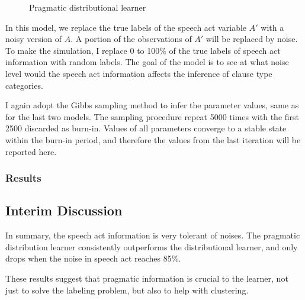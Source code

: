 \begin{figure}[H]
\begin{center}
\end{center}
\caption{Pragmatic distributional learner}\label{fig: noisy-model}
\end{figure}

In this model, we replace the true labels of the speech act variable $A'$ with a noisy version of $A$. A portion of the observations of $A'$ will be replaced by noise. To make the simulation, I replace 0 to 100\% of the true labels of speech act information with random labels. The goal of the model is to see at what noise level would the speech act information affects the inference of clause type categories. 

I again adopt the Gibbs sampling method to infer the parameter values, same as for the last two models. The sampling procedure repeat 5000 times with the first 2500 discarded as burn-in. Values of all parameters converge to a stable state within the burn-in period, and therefore the values from the last iteration will be reported here. 

\subsubsection{Results}
\label{sec:engcl:model:noisy:results}


\subsection{Interim Discussion}
\label{sec:engcl:model:disc}
In summary, the speech act information is very tolerant of noises. The pragmatic distribution learner consistently outperforms the distributional learner, and only drops when the noise in speech act reaches 85\%. 

These results suggest that pragmatic information is crucial to the learner, not just to solve the labeling problem, but also to help with clustering. 

